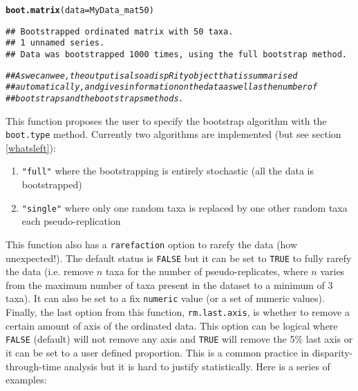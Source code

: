 \documentclass{article}\usepackage[]{graphicx}\usepackage[]{color}
\makeatletter
\newcommand{\hlcom}[1]{\textcolor[rgb]{0.678,0.584,0.686}{\textit{#1}}}%
\newcommand{\hlstd}[1]{\textcolor[rgb]{0.345,0.345,0.345}{#1}}%
\newcommand{\hlkwc}[1]{\textcolor[rgb]{0.333,0.667,0.333}{#1}}%
\newcommand{\hlkwd}[1]{\textcolor[rgb]{0.737,0.353,0.396}{\textbf{#1}}}%
\newenvironment{kframe}{%
 \def\at@end@of@kframe{}%
 \ifinner\ifhmode%
  \def\at@end@of@kframe{\end{minipage}}%
  \begin{minipage}{\columnwidth}%
 \fi\fi%
 \def\FrameCommand##1{\hskip\@totalleftmargin \hskip-\fboxsep
 \colorbox{shadecolor}{##1}\hskip-\fboxsep
     \hskip-\linewidth \hskip-\@totalleftmargin \hskip\columnwidth}%
 \MakeFramed {\advance\hsize-\width
   \@totalleftmargin\z@ \linewidth\hsize
   \@setminipage}}%
 {\par\unskip\endMakeFramed%
 \at@end@of@kframe}
\newenvironment{knitrout}{}{} %
\makeatother
\begin{document}
\begin{knitrout}
\color{fgcolor}\begin{kframe}
\begin{alltt}
\hlkwd{boot.matrix}\hlstd{(}\hlkwc{data} \hlstd{= MyData_mat50)}
\end{alltt}
\begin{verbatim}
## Bootstrapped ordinated matrix with 50 taxa. 
## 1 unnamed series.
## Data was bootstrapped 1000 times, using the full bootstrap method.
\end{verbatim}
\begin{alltt}
\hlcom{## As we can wee, the output is also a dispRity object that is summarised}
\hlcom{## automatically, and gives information on the data as well as the number of}
\hlcom{## bootstraps and the bootstraps methods.}
\end{alltt}
\end{kframe}
\end{knitrout}

This function proposes the user to specify the bootstrap algorithm with the \texttt{boot.type} method.
Currently two algorithms are implemented (but see section \ref{whatsleft}):
\begin{enumerate}
\item \texttt{"full"} where the bootstrapping is entirely stochastic (all the data is bootstrapped)
\item \texttt{"single"} where only one random taxa is replaced by one other random taxa each pseudo-replication
\end{enumerate}
This function also has a \texttt{rarefaction} option to rarefy the data (how unexpected!).
The default status is \texttt{FALSE} but it can be set to \texttt{TRUE} to fully rarefy the data (i.e. remove $n$ taxa for the number of pseudo-replicates, where $n$ varies from the maximum number of taxa present in the dataset to a minimum of 3 taxa).
It can also be set to a fix \texttt{numeric} value (or a set of numeric values).
Finally, the last option from this function, \texttt{rm.last.axis}, is whether to remove a certain amount of axis of the ordinated data.
This option can be logical where \texttt{FALSE} (default) will not remove any axis and \texttt{TRUE} will remove the 5\% last axis or it can be set to a user defined proportion.
This is a common practice in disparity-through-time analysis but it is hard to justify statistically.
Here is a series of examples:
\end{document}
